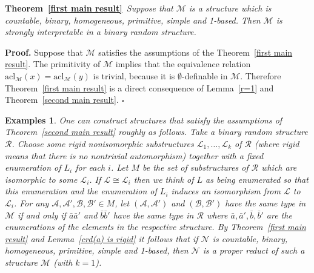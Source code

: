 \documentclass[11pt, twoside]{amsart}
\newtheorem{examps}[theor]{Examples}
\numberwithin{equation}{section}
\newcommand{\acl}{\mathrm{acl}}
\newcommand{\es}{\emptyset}
\newcommand{\mcA}{\mathcal{A}}
\newcommand{\mcB}{\mathcal{B}}
\newcommand{\mcL}{\mathcal{L}}
\newcommand{\mcM}{\mathcal{M}}
\newcommand{\mcN}{\mathcal{N}}
\newcommand{\mcR}{\mathcal{R}}
\begin{document}
\bigskip

\noindent
{\bf Theorem~\ref{first main result}}{\em \ 
Suppose that $\mcM$ is a structure which is countable, binary, homogeneous, primitive, simple and 1-based.
Then $\mcM$ is strongly interpretable in a  binary random structure.
}

\medskip
\noindent
{\bf Proof.}
Suppose that $\mcM$ satisfies the assumptions of the Theorem~\ref{first main result}. The primitivity of $\mcM$ implies that
the equivalence relation $\acl_\mcM(x) = \acl_\mcM(y)$ is trivial, because it is $\es$-definable in $\mcM$.
Therefore Theorem~\ref{first main result} is a direct consequence of 
Lemma~\ref{r=1} and 
Theorem~\ref{second main result}.
\hfill $\square$




\begin{examps}\label{remark on construction of line structures}{\rm
One can construct structures that satisfy the assumptions of Theorem~\ref{second main result}
roughly as follows. Take a binary random structure $\mcR$.
Choose some rigid nonisomorphic substructures $\mcL_1, \ldots, \mcL_k$ of $\mcR$ (where {\em rigid} means that there is no
nontrivial automorphism) together with a fixed enumeration of $L_i$ for each $i$.
Let $M$ be the set of substructures of $\mcR$ which are isomorphic to some $\mcL_i$.
If $\mcL \cong \mcL_i$ then we think of $L$ as being enumerated so that this enumeration
and the enumeration of $L_i$ induces an isomorphism from $\mcL$ to $\mcL_i$.
For any $\mcA, \mcA', \mcB, \mcB' \in M$, let $(\mcA, \mcA')$ and $(\mcB, \mcB')$
have the same type in $\mcM$
if and only if $\bar{a}\bar{a}'$ and $\bar{b}\bar{b}'$ have the same type in $\mcR$ where 
$\bar{a}, \bar{a}', \bar{b}, \bar{b}'$ are the enumerations of the elements in the respective structure.
By Theorem~\ref{first main result} and 
Lemma~\ref{crd(a) is rigid} 
it follows that if $\mcN$ is countable, binary, homogeneous, primitive,
simple and 1-based, then $\mcN$ is a proper reduct of such a structure $\mcM$ (with $k = 1$).
}
\end{examps}
\end{document}
